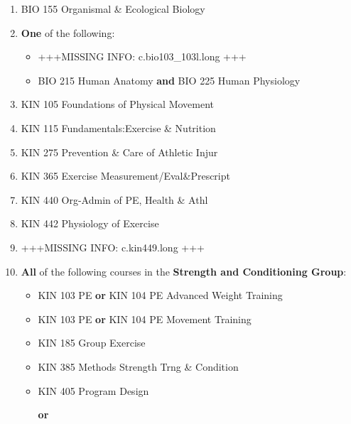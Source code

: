 \documentclass[
  letterpaper,
]{scrbook}
\providecommand{\tightlist}{%
  \setlength{\itemsep}{0pt}\setlength{\parskip}{0pt}}
\begin{document}
\begin{enumerate}
\def\labelenumi{\arabic{enumi}.}
\tightlist
\item
  BIO 155 Organismal \& Ecological Biology\\
\item
  \textbf{One} of the following:

  \begin{itemize}
  \tightlist
  \item
    +++MISSING INFO: c.bio103\_103l.long +++\\
  \item
    BIO 215 Human Anatomy \textbf{and} BIO 225 Human Physiology\\
  \end{itemize}
\item
  KIN 105 Foundations of Physical Movement\\
\item
  KIN 115 Fundamentals:Exercise \& Nutrition\\
\item
  KIN 275 Prevention \& Care of Athletic Injur\\
\item
  KIN 365 Exercise Measurement/Eval\&Prescript\\
\item
  KIN 440 Org-Admin of PE, Health \& Athl\\
\item
  KIN 442 Physiology of Exercise\\
\item
  +++MISSING INFO: c.kin449.long +++\\
\item
  \textbf{All} of the following courses in the \textbf{Strength and
  Conditioning Group}:

  \begin{itemize}
  \item
    KIN 103 PE \textbf{or} KIN 104 PE Advanced Weight Training\\
  \item
    KIN 103 PE \textbf{or} KIN 104 PE Movement Training\\
  \item
    KIN 185 Group Exercise\\
  \item
    KIN 385 Methods Strength Trng \& Condition\\
  \item
    KIN 405 Program Design

    \textbf{or}
  \end{itemize}


\end{enumerate}
\end{document}
